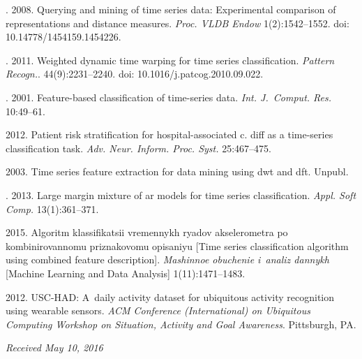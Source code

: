 \begin{multicols}{2}
{{\begin{thebibliography}{99}
.
2008.
 Querying and mining of time series data: Experimental comparison of 
 representations and distance measures.
\textit{Proc. VLDB Endow} 1(2):1542--1552.
 doi: 10.14778/1454159.1454226.

.
2011.
 Weighted dynamic time warping for time series classification.
\textit{Pattern Recogn.}. 44(9):2231--2240.
doi: 10.1016/j.patcog.2010.09.022.

.
2001.
Feature-based classification of time-series data.
\textit{Int. J.~Comput. Res.} 10:49--61.

2012.
Patient risk stratification for hospital-associated c. diff as a time-series classification task.
\textit{Adv. Neur. Inform. Proc. Syst.} 25:467--475.

2003.
Time series feature extraction for data mining using dwt and dft.
Unpubl.

.
2013.
 Large margin mixture of ar models for time series classification.
\textit{Appl. Soft Comp.} 13(1):361--371.

2015.
Algoritm klassifikatsii vremennykh ryadov akselerometra po kombinirovannomu 
priznakovomu opisaniyu [Time series classification algorithm using combined feature description].
\textit{Mashinnoe obuchenie i~analiz dannykh} [Machine Learning and Data Analysis]
 1(11):1471--1483.

2012.
USC-HAD: A~daily activity dataset for ubiquitous activity recognition
  using wearable sensors.
\textit{ACM Conference (International)
on Ubiquitous Computing Workshop on Situation, Activity and Goal Awareness}. 
Pittsburgh, PA.
\end{thebibliography}

 }
 }

\end{multicols}

\vspace*{-3pt}

\hfill{\small\textit{Received May 10, 2016}}


